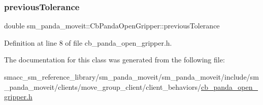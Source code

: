 \subsubsection{\texorpdfstring{previous\+Tolerance}{previousTolerance}}
{\footnotesize\ttfamily double sm\+\_\+panda\+\_\+moveit\+::\+Cb\+Panda\+Open\+Gripper\+::previous\+Tolerance\hspace{0.3cm}{\ttfamily [private]}}



Definition at line 8 of file cb\+\_\+panda\+\_\+open\+\_\+gripper.\+h.



The documentation for this class was generated from the following file\+:\begin{DoxyCompactItemize}
\item 
smacc\+\_\+sm\+\_\+reference\+\_\+library/sm\+\_\+panda\+\_\+moveit/sm\+\_\+panda\+\_\+moveit/include/sm\+\_\+panda\+\_\+moveit/clients/move\+\_\+group\+\_\+client/client\+\_\+behaviors/\hyperlink{cb__panda__open__gripper_8h}{cb\+\_\+panda\+\_\+open\+\_\+gripper.\+h}\end{DoxyCompactItemize}
